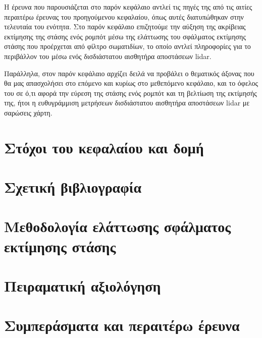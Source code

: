 Η έρευνα που παρουσιάζεται στο παρόν κεφάλαιο αντλεί τις πηγές της από τις
αιτίες περαιτέρω έρευνας του προηγούμενου κεφαλαίου, όπως αυτές διατυπώθηκαν
στην τελευταία του ενότητα. Στο παρόν κεφάλαιο επιζητούμε την αύξηση της
ακρίβειας εκτίμησης της στάσης ενός ρομπότ μέσω της ελάττωσης του σφάλματος
εκτίμησης στάσης που προέρχεται από φίλτρο σωματιδίων, το οποίο αντλεί
πληροφορίες για το περιβάλλον του μέσω ενός δισδιάστατου αισθητήρα αποστάσεων
lidar.

Παράλληλα, στον παρόν κεφάλαιο αρχίζει δειλά να προβάλει ο θεματικός άξονας που
θα μας απασχολήσει στο επόμενο και κυρίως στο μεθεπόμενο κεφάλαιο, και το όφελος
του σε ό,τι αφορά την εύρεση της στάσης ενός ρομπότ και τη βελτίωση της
εκτίμησής της, ήτοι η ευθυγράμμιση μετρήσεων δισδιάστατου αισθητήρα αποστάσεων
lidar με σαρώσεις χάρτη.

\section{Στόχοι του κεφαλαίου και δομή}
  \label{section:02_02_01}
  

\section{Σχετική βιβλιογραφία}
  \label{section:02_02_02}
  

\section{Μεθοδολογία ελάττωσης σφάλματος εκτίμησης στάσης}
  \label{section:02_02_03}
  

\section{Πειραματική αξιολόγηση}
  \label{section:02_02_04}
  

\section{Συμπεράσματα και περαιτέρω έρευνα}
  \label{section:02_02_05}
  
